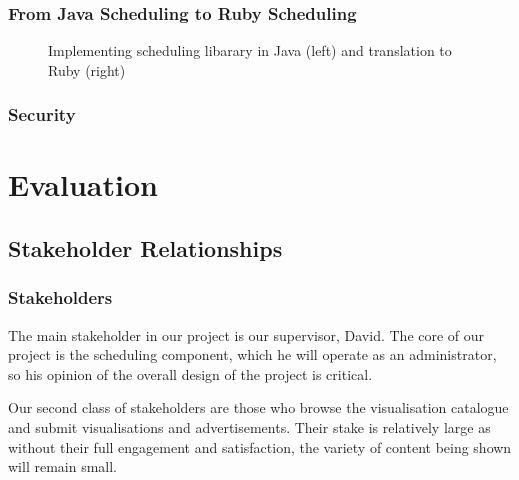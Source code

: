 \documentclass[a4paper, titlepage]{article}
\begin{document}

\subsubsection{From Java Scheduling to Ruby Scheduling}

\begin{figure}[ht]
  \begin{minipage}{0.49\textwidth}
  \end{minipage}
  \begin{minipage}{0.49\textwidth}
  \end{minipage}
    
  \caption{Implementing scheduling libarary in Java (left) and translation to Ruby (right)}
  \label{fig:impl_translation}
\end{figure}


\subsubsection{Security}



\newpage
\section{Evaluation}

\subsection{Stakeholder Relationships}

\subsubsection{Stakeholders}

The main stakeholder in our project is our supervisor, David. The core of our project is the scheduling component, which he will operate as an administrator, so his opinion of the overall design of the project is critical.

Our second class of stakeholders are those who browse the visualisation catalogue and submit visualisations and advertisements. Their stake is relatively large as without their full engagement and satisfaction, the variety of content being shown will remain small. 
\end{document}
